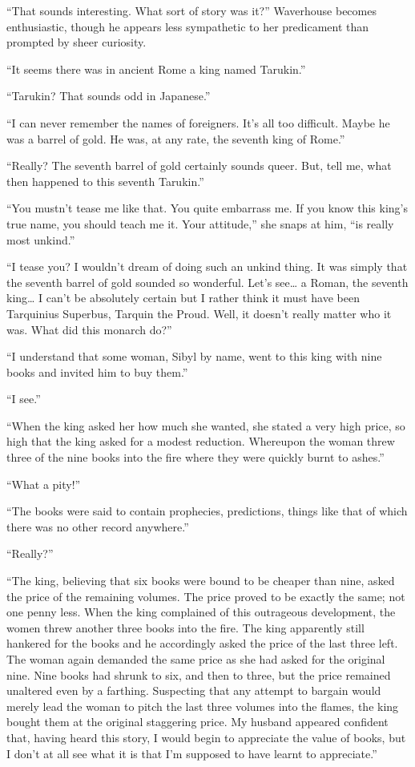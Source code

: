 \documentclass[12pt, openright]{book}
\begin{document}
``That sounds interesting. What sort of story was it?'' Waverhouse
becomes enthusiastic, though he appears less sympathetic to her
predicament than prompted by sheer curiosity.

``It seems there was in ancient Rome a king named Tarukin.''

``Tarukin? That sounds odd in Japanese.''

``I can never remember the names of foreigners. It's all too difficult.
Maybe he was a barrel of gold. He was, at any rate, the seventh king of
Rome.''

``Really? The seventh barrel of gold certainly sounds queer. But, tell
me, what then happened to this seventh Tarukin.''

``You mustn't tease me like that. You quite embarrass me. If you know
this king's true name, you should teach me it. Your attitude,'' she
snaps at him, ``is really most unkind.''

``I tease you? I wouldn't dream of doing such an unkind thing. It was
simply that the seventh barrel of gold sounded so wonderful. Let's
see\ldots{} a Roman, the seventh king\ldots{} I can't be absolutely
certain but I rather think it must have been Tarquinius Superbus,
Tarquin the Proud. Well, it doesn't really matter who it was. What did
this monarch do?''

``I understand that some woman, Sibyl by name, went to this king with
nine books and invited him to buy them.''

``I see.''

``When the king asked her how much she wanted, she stated a very high
price, so high that the king asked for a modest reduction. Whereupon the
woman threw three of the nine books into the fire where they were
quickly burnt to ashes.''

``What a pity!''

``The books were said to contain prophecies, predictions, things like
that of which there was no other record anywhere.''

``Really?''

``The king, believing that six books were bound to be cheaper than nine,
asked the price of the remaining volumes. The price proved to be exactly
the same; not one penny less. When the king complained of this
outrageous development, the women threw another three books into the
fire. The king apparently still hankered for the books and he
accordingly asked the price of the last three left. The woman again
demanded the same price as she had asked for the original nine. Nine
books had shrunk to six, and then to three, but the price remained
unaltered even by a farthing. Suspecting that any attempt to bargain
would merely lead the woman to pitch the last three volumes into the
flames, the king bought them at the original staggering price. My
husband appeared confident that, having heard this story, I would begin
to appreciate the value of books, but I don't at all see what it is that
I'm supposed to have learnt to appreciate.''
\end{document}
